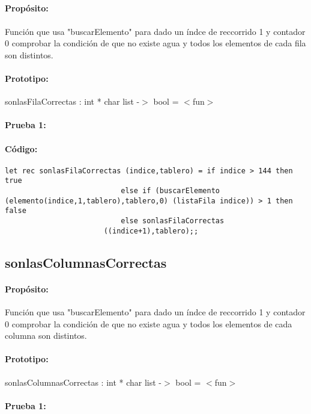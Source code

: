 \subsection{}

\paragraph{Propósito:} Función que usa "buscarElemento" para dado un índce de reccorrido 1 y
contador 0 comprobar la condición de que no existe agua y todos los elementos de
cada fila son distintos. 
\paragraph{Prototipo:} sonlasFilaCorrectas : int * char list -$>$ bool = $<$fun$>$
\paragraph{Prueba 1:}
\paragraph{Código:}
\begin{verbatim}
let rec sonlasFilaCorrectas (indice,tablero) = if indice > 144 then true
					       else if (buscarElemento
(elemento(indice,1,tablero),tablero,0) (listaFila indice)) > 1 then false 
					       else sonlasFilaCorrectas
				       ((indice+1),tablero);;
\end{verbatim}

\subsection{sonlasColumnasCorrectas}

\paragraph{Propósito:} Función que usa "buscarElemento" para dado un índce de reccorrido 1 y
contador 0 comprobar la condición de que no existe agua y todos los elementos de
cada columna son distintos. 
\paragraph{Prototipo:} sonlasColumnasCorrectas : int * char list -$>$ bool = $<$fun$>$
\paragraph{Prueba 1:}

